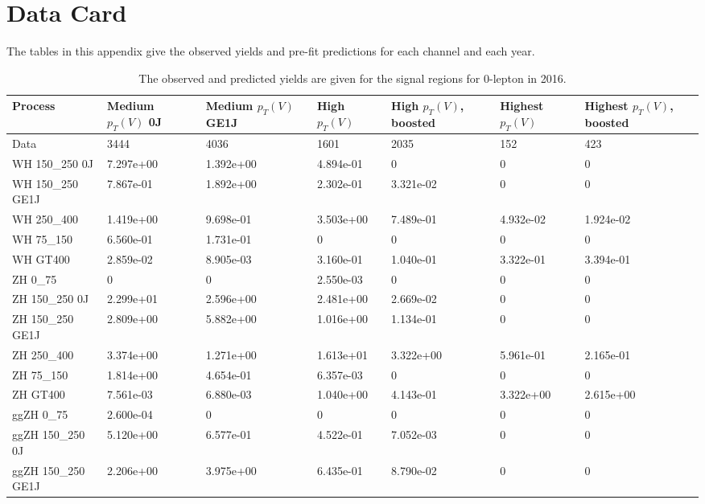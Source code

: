 \chapter{Data Card} \label{app:datacard}


            The tables in this appendix give the observed yields
            and pre-fit predictions for each channel and each year.
            
\begin{table}
\centering
\caption[2016 0-lepton signal selection yields]{
                  The observed and predicted yields are given for the
                  signal regions for 0-lepton in 2016.
                  }
{\footnotesize
\begin{tabularx}{\textwidth}{|X|X|X|X|X|X|X|}
\hline
Process & Medium $p_{T}(V)$ 0J & Medium $p_{T}(V)$ GE1J & High $p_{T}(V)$ & High $p_{T}(V)$, boosted & Highest $p_{T}(V)$ & Highest $p_{T}(V)$, boosted \\
\hline
Data & 3444 & 4036 & 1601 & 2035 & 152 & 423 \\
\hline
WH 150\_250 0J & 7.297e+00 & 1.392e+00 & 4.894e-01 & 0 & 0 & 0 \\
WH 150\_250 GE1J & 7.867e-01 & 1.892e+00 & 2.302e-01 & 3.321e-02 & 0 & 0 \\
WH 250\_400 & 1.419e+00 & 9.698e-01 & 3.503e+00 & 7.489e-01 & 4.932e-02 & 1.924e-02 \\
WH 75\_150 & 6.560e-01 & 1.731e-01 & 0 & 0 & 0 & 0 \\
WH GT400 & 2.859e-02 & 8.905e-03 & 3.160e-01 & 1.040e-01 & 3.322e-01 & 3.394e-01 \\
ZH 0\_75 & 0 & 0 & 2.550e-03 & 0 & 0 & 0 \\
ZH 150\_250 0J & 2.299e+01 & 2.596e+00 & 2.481e+00 & 2.669e-02 & 0 & 0 \\
ZH 150\_250 GE1J & 2.809e+00 & 5.882e+00 & 1.016e+00 & 1.134e-01 & 0 & 0 \\
ZH 250\_400 & 3.374e+00 & 1.271e+00 & 1.613e+01 & 3.322e+00 & 5.961e-01 & 2.165e-01 \\
ZH 75\_150 & 1.814e+00 & 4.654e-01 & 6.357e-03 & 0 & 0 & 0 \\
ZH GT400 & 7.561e-03 & 6.880e-03 & 1.040e+00 & 4.143e-01 & 3.322e+00 & 2.615e+00 \\
ggZH 0\_75 & 2.600e-04 & 0 & 0 & 0 & 0 & 0 \\
ggZH 150\_250 0J & 5.120e+00 & 6.577e-01 & 4.522e-01 & 7.052e-03 & 0 & 0 \\
ggZH 150\_250 GE1J & 2.206e+00 & 3.975e+00 & 6.435e-01 & 8.790e-02 & 0 & 0 \\

\end{tabularx}}
\end{table}
